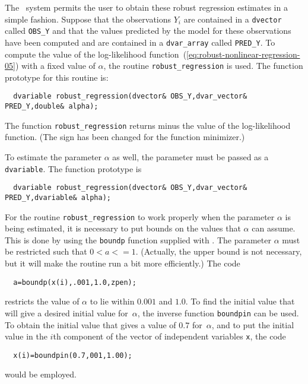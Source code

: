 \documentclass{admbmanual}
\begin{document}
The \scAD\ system permits the user to obtain these robust regression
estimates in a simple fashion. Suppose that the observations $Y_i$
are contained in a \texttt{dvector} called \texttt{OBS\_Y} and that the values 
predicted by the model for these observations have been computed and
are contained in a \texttt{dvar\_array} called \texttt{PRED\_Y}. To compute the
value of the log-likelihood function~(\ref{eq:robust-nonlinear-regression-05}) %
with a fixed
value of $\alpha$, the
routine \texttt{robust\_regression} is used.
The function prototype for this routine is:
\begin{lstlisting}
  dvariable robust_regression(dvector& OBS_Y,dvar_vector& PRED_Y,double& alpha);
\end{lstlisting}
The function \texttt{robust\_regression} returns minus the
value of the log-likelihood function. (The sign has been
changed for the function minimizer.)
\begin{figure}
  \centering\hskip1pt
   
   \emptycaption{} 
   \label{fig:robust-nonlinear-regression-01} %
\end{figure}

To estimate the parameter $\alpha$ as well, the parameter must be passed as
a \texttt{dvariable}.  The function prototype is
\begin{lstlisting}
  dvariable robust_regression(dvector& OBS_Y,dvar_vector& PRED_Y,dvariable& alpha);
\end{lstlisting}

For the routine \texttt{robust\_regression} to work properly 
when the parameter $\alpha$ is being estimated,
it is necessary to
put bounds on the values that $\alpha$ can assume. This is done by
using the \texttt{boundp} function supplied with \scAD. The parameter $\alpha$ must
be restricted such that $0<a<=1$. (Actually, the upper bound is not necessary,
but it will make the routine run a bit more efficiently.) 
The code
\begin{lstlisting}
  a=boundp(x(i),.001,1.0,zpen); 
\end{lstlisting}
restricts the value of $\alpha$ to lie within $0.001$ and $1.0$.
To find the initial value 
that will give a desired initial value 
for~$\alpha$, the inverse function \texttt{boundpin} can be used. To
obtain the initial value that gives a value of $0.7$ for~$\alpha$,
and to put the initial value in the $i$th component of the vector
of independent variables \texttt{x}, the code
\begin{lstlisting}
  x(i)=boundpin(0.7,001,1.00); 
\end{lstlisting}
would be employed.
\end{document}
